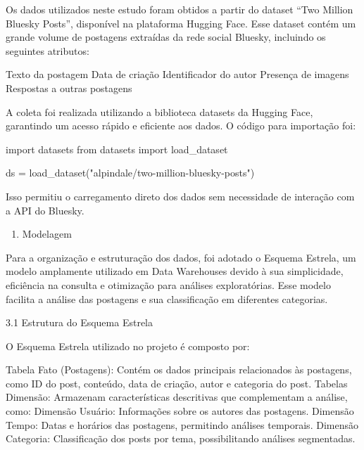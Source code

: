 \documentclass[
  letterpaper,
  DIV=11,
  numbers=noendperiod]{scrartcl}
\newenvironment{Shaded}{\begin{snugshade}}{\end{snugshade}}
\newcommand{\ImportTok}[1]{\textcolor[rgb]{0.00,0.46,0.62}{#1}}
\newcommand{\NormalTok}[1]{\textcolor[rgb]{0.00,0.23,0.31}{#1}}
\newcommand{\OperatorTok}[1]{\textcolor[rgb]{0.37,0.37,0.37}{#1}}
\newcommand{\StringTok}[1]{\textcolor[rgb]{0.13,0.47,0.30}{#1}}
\providecommand{\tightlist}{%
  \setlength{\itemsep}{0pt}\setlength{\parskip}{0pt}}\usepackage{longtable,booktabs,array}
\begin{document}
Os dados utilizados neste estudo foram obtidos a partir do dataset ``Two
Million Bluesky Posts'', disponível na plataforma Hugging Face. Esse
dataset contém um grande volume de postagens extraídas da rede social
Bluesky, incluindo os seguintes atributos:

\begin{VerbatimWithBreaks}
Texto da postagem
Data de criação
Identificador do autor
Presença de imagens
Respostas a outras postagens
\end{VerbatimWithBreaks}

A coleta foi realizada utilizando a biblioteca datasets da Hugging Face,
garantindo um acesso rápido e eficiente aos dados. O código para
importação foi:

\begin{Shaded}
\begin{Highlighting}[]
\ImportTok{import}\NormalTok{ datasets}
\ImportTok{from}\NormalTok{ datasets }\ImportTok{import}\NormalTok{ load\_dataset}

\NormalTok{ds }\OperatorTok{=}\NormalTok{ load\_dataset(}\StringTok{"alpindale/two{-}million{-}bluesky{-}posts"}\NormalTok{)}
\end{Highlighting}
\end{Shaded}

Isso permitiu o carregamento direto dos dados sem necessidade de
interação com a API do Bluesky.

\begin{enumerate}
\def\labelenumi{\arabic{enumi}.}
\setcounter{enumi}{2}
\tightlist
\item
  Modelagem
\end{enumerate}

Para a organização e estruturação dos dados, foi adotado o Esquema
Estrela, um modelo amplamente utilizado em Data Warehouses devido à sua
simplicidade, eficiência na consulta e otimização para análises
exploratórias. Esse modelo facilita a análise das postagens e sua
classificação em diferentes categorias.

3.1 Estrutura do Esquema Estrela

O Esquema Estrela utilizado no projeto é composto por:

\begin{VerbatimWithBreaks}
Tabela Fato (Postagens): Contém os dados principais relacionados às postagens, como ID do post, conteúdo, data de criação, autor e categoria do post.
Tabelas Dimensão: Armazenam características descritivas que complementam a análise, como:
    Dimensão Usuário: Informações sobre os autores das postagens.
    Dimensão Tempo: Datas e horários das postagens, permitindo análises temporais.
    Dimensão Categoria: Classificação dos posts por tema, possibilitando análises segmentadas.
\end{VerbatimWithBreaks}
\end{document}
